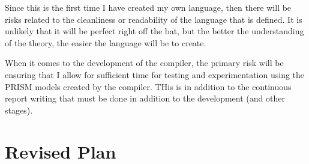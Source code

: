 \documentclass[11pt, a4paper]{article}
\begin{document}
Since this is the first time I have created my own language, then there will be
risks related to the cleanliness or readability of the language that is defined.
It is unlikely that it will be perfect right off the bat, but the better the
understanding of the theory, the easier the language will be to create.

When it comes to the development of the compiler, the primary risk will be
ensuring that I allow for sufficient time for testing and experimentation using
the PRISM models created by the compiler. THis is in addition to the continuous
report writing that must be done in addition to the development (and other
stages).


\section{Revised Plan} %
\label{sec:revised_plan}

\end{document}
